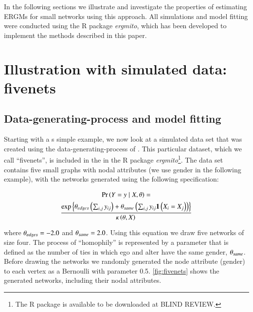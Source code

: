 \documentclass[review, nonatbib,doubleblind]{elsarticle/elsarticle}
\begin{document}

In the following sections we illustrate and investigate the properties of estimating ERGMs for small networks using this approach. All simulations and model fitting were conducted using the R package \textit{ergmito}, which has been developed to implement the methods described in this paper.

\section{Illustration with simulated data: fivenets}

\subsection{Data-generating-process and model fitting}

Starting with a s simple example, we now look at a simulated data set that was created using the data-generating-process of \ergmitos{}. This particular dataset, which we call ``fivenets'', is included in the in the R package \textit{ergmito}\footnote{The R package is available to be downloaded at  BLIND REVIEW.}. %
The data set contains five small graphs with nodal attributes (we use gender in the following example), with the networks generated using the following specification:

\begin{multline*}
\Prcond{\Adjmat = \adjmat}{\Indepvar, \params} = \\
\frac{ %
    \exp{\params_{edges}\left(\sum_{i,j} \adjmat_{ij}\right) + %
    \params_{same}\left(\sum_{i,j} \adjmat_{ij}\isone{\Indepvar_{i} = \Indepvar_{j}}\right)} %
    }{%
    \normconst{}
    }
\end{multline*}

\noindent where $\theta_{edges} = -2.0$ and $\theta_{same} = 2.0$. Using this equation we draw five networks of size four. The process of ``homophily'' is represented by a parameter that is defined as the number of ties in which ego and alter have the same gender, $\theta_{same}$. Before drawing the networks we randomly generated the node attribute (gender) to each vertex as a Bernoulli with parameter 0.5. \autoref{fig:fivenets} shows the generated networks, including their nodal attributes.
\end{document}
